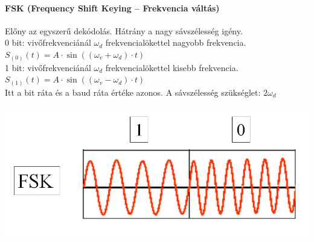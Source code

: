 \begin{multicols}{2}
\paragraph{FSK (Frequency Shift Keying -- Frekvencia váltás)} Előny az egyszerű dekódolás. Hátrány a nagy sávszélesség igény.\\
0 bit: vivőfrekvenciánál $\omega_d$ frekvencialökettel nagyobb frekvencia. $S_{(0)}(t) = A\cdot\sin((\omega_v + \omega_d)\cdot t) $\\
1 bit: vivőfrekvenciánál $\omega_d$ frekvencialökettel kisebb frekvencia. $S_{(1)}(t) = A\cdot\sin((\omega_v - \omega_d)\cdot t) $\\
Itt a bit ráta és a baud ráta értéke azonos. A sávszélesség szükséglet: $2\omega_d$
\begin{center}
	\includegraphics[width=\linewidth]{fig/12-FSK}
\end{center}
\end{multicols}

